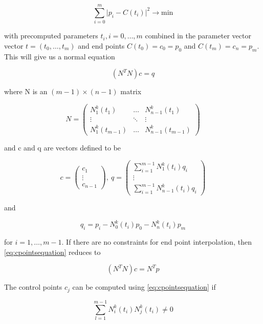 $$ \sum_{i = 0}^{m}\lvert p_{i} - C(t_{i}) \rvert^{2} \rightarrow \text{min} $$

with precomputed parameters $t_{i}, i = 0, \ldots, m$ combined in the parameter vector vector $t = (t_{0}, \ldots, t_{m})$ and end points $C(t_{0}) = c_{0} = p_{0}$ and $C(t_{m}) = c_{n} = p_{m}$. This will give us a normal equation

\begin{equation}
(N^{\textit{T}}N)c = q \label{eq:cpointsequation}
\end{equation}

where N is an $(m - 1) \times (n - 1)$ matrix

$$ N = 
\begin{pmatrix}
 N^{k}_{1}(t_{1})     & \ldots & N^{k}_{n - 1}(t_{1}) \\
 \vdots               & \ddots & \vdots \\
 N^{k}_{1}(t_{m - 1}) & \ldots & N^{k}_{n - 1}(t_{m - 1})
\end{pmatrix}
$$

and c and q are vectors defined to be

$$ c =
\begin{pmatrix}
 c_{1}  \\
 \vdots \\
 c_{n - 1}
\end{pmatrix}, \:
q =
\begin{pmatrix}
\sum_{i = 1}^{m - 1} N^{k}_{1}(t_{i})q_{i} \\
\vdots \\
\sum_{i = 1}^{m - 1} N^{k}_{n - 1}(t_{i})q_{i}
\end{pmatrix}
$$

and

$$ q_{i} = p_{i} - N^{k}_{0}(t_{i})p_{0} - N^{k}_{n}(t_{i})p_{m} $$

for $i = 1, \ldots, m - 1$. If there are no constraints for end point interpolation, then \ref{eq:cpointsequation} reduces to

\begin{equation}
(N^{\textit{T}}N)c = N^{\textit{T}}p
\end{equation}

The control points $c_{j}$ can be computed using \ref{eq:cpointsequation} if

\begin{equation}
\sum_{l = 1}^{m - 1} N^{k}_{i}(t_{i})N^{k}_{j}(t_{i}) \neq 0
\end{equation}